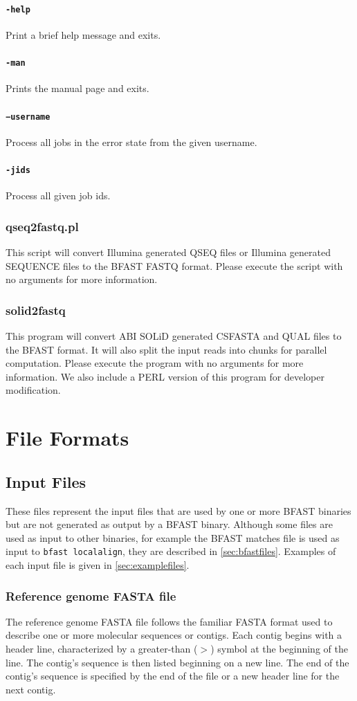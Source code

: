 \documentclass[a4paper,12pt]{book}
\newcommand{\TT}[1]{{\tt #1}} %
\newcommand{\rGFF}{reference genome FASTA file}
\newcommand{\RGFF}{Reference genome FASTA file}
\newcommand{\BMF}{BFAST matches file} %
\begin{document}
\subsubsection{\TT{-help}}
Print a brief help message and exits.
\subsubsection{\TT{-man}}
Prints the manual page and exits.
\subsubsection{\TT{−username}}
Process all jobs in the error state from the given username.
\subsubsection{\TT{-jids}}
Process all given job ids.

\subsection{qseq2fastq.pl}
This script will convert Illumina generated QSEQ files or Illumina generated SEQUENCE files to the BFAST FASTQ format.
Please execute the script with no arguments for more information.
\subsection{solid2fastq}
This program will convert ABI SOLiD generated CSFASTA and QUAL files to the BFAST format.
It will also split the input reads into chunks for parallel computation.
Please execute the program with no arguments for more information.
We also include a PERL version of this program for developer modification.
\chapter{File Formats}
\section{Input Files}
\label{sec:inputfiles}
These files represent the input files that are used by one or more BFAST binaries but are not generated as output by a BFAST binary.
Although some files are used as input to other binaries, for example the \BMF{} is used as input to \TT{bfast localalign}, they are described in \autoref{sec:bfastfiles}.
Examples of each input file is given in \autoref{sec:examplefiles}.
\subsection{\RGFF{}}
\label{sec:rgfastafile}
The \rGFF{} follows the familiar FASTA format used to describe one or more molecular sequences or contigs.
Each contig begins with a header line, characterized by a greater-than ($>$) symbol at the beginning of the line.
The contig's sequence is then listed beginning on a new line.
The end of the contig's sequence is specified by the end of the file or a new header line for the next contig.
\end{document}
